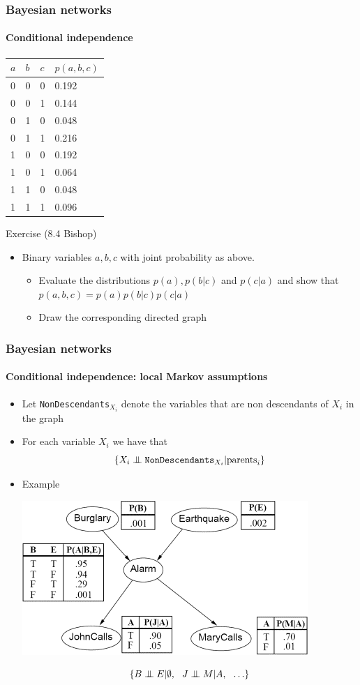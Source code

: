 \documentclass[slidestop,compress,mathserif]{beamer}
\newcommand{\indep}{\ensuremath{\perp\mkern -10mu \perp}}
\begin{document}
\begin{frame}
	\frametitle{Bayesian networks}
	\framesubtitle{Conditional independence}
\centering
\begin{tabular}{l|l|l|l}
$a$ & $b$ & $c$ & $p(a,b,c)$\\ \hline
0   & 0   & 0   & 0.192      \\
0   & 0   & 1   & 0.144      \\
0   & 1   & 0   & 0.048      \\
0   & 1   & 1   & 0.216      \\
1   & 0   & 0   & 0.192      \\
1   & 0   & 1   & 0.064      \\
1   & 1   & 0   & 0.048      \\
1   & 1   & 1   & 0.096     
\end{tabular}
	\begin{block}{Exercise (8.4 Bishop)}
    \begin{itemize}
    \item Binary variables $a,b,c$ with joint probability as above.
    \begin{itemize}
    	\item Evaluate the distributions $p(a),p(b|c)$ and $p(c|a)$ and show that $p(a,b,c)=p(a)p(b|c)p(c|a)$
    	\item Draw the corresponding directed graph
    \end{itemize}
    \end{itemize} 
    \end{block}
\end{frame}


\begin{frame}
	\frametitle{Bayesian networks}
	\framesubtitle{Conditional independence: local Markov assumptions}

    \begin{itemize}
    \item Let \texttt{NonDescendants}$_{X_i}$ denote the variables that are non descendants of $X_i$ in the graph
    \item For each variable $X_i$ we have that
	$$\{X_i \indep \texttt{NonDescendants}_{X_i} | \text{parents}_i \} $$ 
	\item Example
    \begin{center}
    \includegraphics[width=.4\textwidth]{burglary.png}
    \end{center}
	$$\{B\indep E | \emptyset,~~J \indep M | A, ~~\hdots\}$$
    \end{itemize} 

\end{frame}
\end{document}
